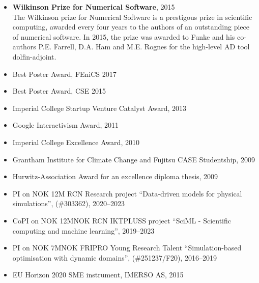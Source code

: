 \documentclass[11pt]{article}
\begin{document}
\begin{itemize}
\item {\textbf{Wilkinson Prize for Numerical Software}}, 2015\\
    The Wilkinson prize for Numerical Software is a prestigous prize in scientific computing, awarded every four years to the authors of an outstanding piece of numerical software.
    In 2015, the prize was awarded to Funke and his co-authors P.E. Farrell, D.A. Ham and M.E. Rognes for the high-level AD tool dolfin-adjoint.
\item Best Poster Award, FEniCS 2017
\item Best Poster Award, CSE 2015
\item Imperial College Startup Venture Catalyst Award, 2013
\item {Google Interactivism Award}, 2011
\item {Imperial College Excellence Award}, 2010%
\item {Grantham Institute for Climate Change and Fujitsu CASE Studentship}, 2009
\item Hurwitz-Association Award for an excellence diploma thesis, 2009
\end{itemize}

\begin{itemize}
\item PI on NOK 12M RCN Research project ``Data-driven models for physical simulations'', (\#303362), 2020--2023
\item CoPI on NOK 12MNOK RCN IKTPLUSS project ``SciML - Scientific computing and machine learning'', 2019--2023
\item PI on NOK 7MNOK FRIPRO Young Research Talent ``Simulation-based optimisation with dynamic domains'', (\#251237/F20), 2016--2019
\item EU Horizon 2020 SME instrument, IMERSO AS, 2015
\end{itemize}
\end{document}
